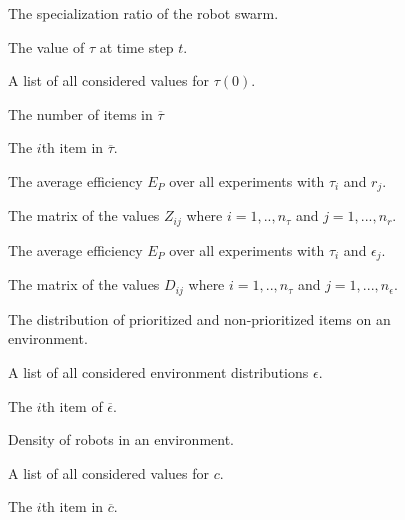 \begin{description}
	\item[\parbox{\namewidth}{$\tau$}] The specialization ratio of the robot swarm.

	\item[\parbox{\namewidth}{$\tau(t)$}] The value of $\tau$ at time step $t$.

	\item[\parbox{\namewidth}{$\overline{\tau}$}] A list of all considered values for $\tau(0)$.

	\item[\parbox{\namewidth}{$n_\tau$}] The number of items in $\overline{\tau}$

	\item[\parbox{\namewidth}{$\tau_i(0)$}] The $i$th item in $\overline{\tau}$.

	\item[\parbox{\namewidth}{$Z_{ij}$}] The average efficiency $E_P$ over all experiments with $\tau_i$ and $r_j$.
	
	\item[\parbox{\namewidth}{$Z$}] The matrix of the values $Z_{ij}$ where $i=1,..,n_\tau$ and $j=1,...,n_r$.

	\item[\parbox{\namewidth}{$D_{ij}$}] The average efficiency $E_P$ over all experiments with $\tau_i$ and $\epsilon_j$.
	
	\item[\parbox{\namewidth}{$D$}] The matrix of the values $D_{ij}$ where $i=1,..,n_\tau$ and $j=1,...,n_\epsilon$.
	

	\item[\parbox{\namewidth}{$\epsilon$}] The distribution of prioritized and non-prioritized items on an environment.

	\item[\parbox{\namewidth}{$\overline{\epsilon}$}] A list of all considered environment distributions $\epsilon$.

	\item[\parbox{\namewidth}{$\epsilon_i$}] The $i$th item of $\overline{\epsilon}$.

	\item[\parbox{\namewidth}{$c$}] Density of robots in an environment.

	\item[\parbox{\namewidth}{$\overline{c}$}] A list of all considered values for $c$.
	
	\item[\parbox{\namewidth}{$c_i$}] The $i$th item in $\overline{c}$.


\end{description}
